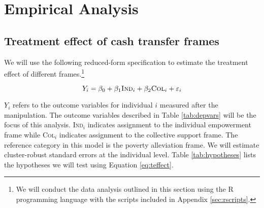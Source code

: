 \documentclass[11pt, a4paper]{article}\usepackage[]{graphicx}\usepackage[]{color}
\begin{document}
\section{Empirical Analysis}

    \subsection{Treatment effect of cash transfer frames}

        We will use the following reduced-form specification to estimate the treatment effect of different frames.\footnote{We will conduct the data analysis outlined in this section using the R programming language with the scripts included in Appendix \ref{sec:rscripts}.}

  		\begin{equation} \label{eq:teffect}
            Y_{i} = \beta_{0} + \beta_{1}\text{\textsc{Ind}}_{i} + \beta_{2}\text{\textsc{Col}}_{i} + \varepsilon_{i}
		\end{equation}

        $Y_{i}$ refers to the outcome variables for individual $i$ measured after the manipulation. The outcome variables described in Table \ref{tab:depvars} will be the focus of this analysis. \textsc{Ind}$_{i}$ indicates assignment to the individual empowerment frame while \textsc{Col}$_{i}$ indicates assignment to the collective support frame. The reference category in this model is the poverty alleviation frame. We will estimate cluster-robust standard errors at the individual level. Table \ref{tab:hypotheses} lists the hypotheses we will test using Equation \ref{eq:teffect}.

        \begin{table}[h]
        \centering
        \caption{Primary outcome variables}
        \label{tab:depvars}
        \end{table}
\end{document}
